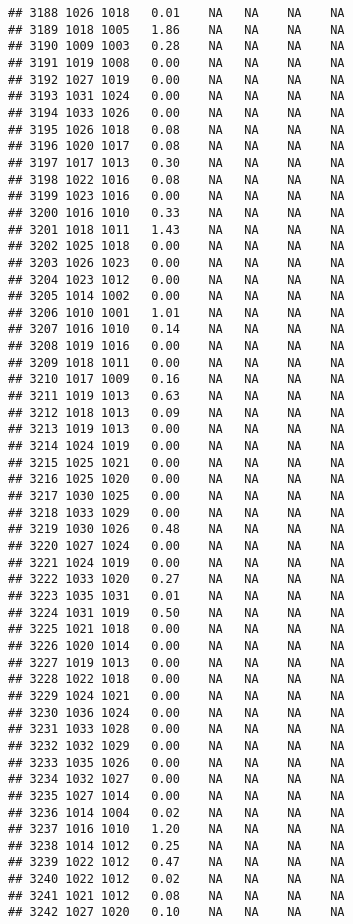 \documentclass{article}\usepackage{graphicx, color}
\makeatletter
\newenvironment{kframe}{%
 \def\at@end@of@kframe{}%
 \ifinner\ifhmode%
  \def\at@end@of@kframe{\end{minipage}}%
  \begin{minipage}{\columnwidth}%
 \fi\fi%
 \def\FrameCommand##1{\hskip\@totalleftmargin \hskip-\fboxsep
 \colorbox{shadecolor}{##1}\hskip-\fboxsep
     \hskip-\linewidth \hskip-\@totalleftmargin \hskip\columnwidth}%
 \MakeFramed {\advance\hsize-\width
   \@totalleftmargin\z@ \linewidth\hsize
   \@setminipage}}%
 {\par\unskip\endMakeFramed%
 \at@end@of@kframe}
\newenvironment{knitrout}{}{} %
\makeatother
\begin{document}
\begin{knitrout}
\begin{kframe}
\begin{verbatim}
## 3188 1026 1018   0.01    NA   NA    NA    NA
## 3189 1018 1005   1.86    NA   NA    NA    NA
## 3190 1009 1003   0.28    NA   NA    NA    NA
## 3191 1019 1008   0.00    NA   NA    NA    NA
## 3192 1027 1019   0.00    NA   NA    NA    NA
## 3193 1031 1024   0.00    NA   NA    NA    NA
## 3194 1033 1026   0.00    NA   NA    NA    NA
## 3195 1026 1018   0.08    NA   NA    NA    NA
## 3196 1020 1017   0.08    NA   NA    NA    NA
## 3197 1017 1013   0.30    NA   NA    NA    NA
## 3198 1022 1016   0.08    NA   NA    NA    NA
## 3199 1023 1016   0.00    NA   NA    NA    NA
## 3200 1016 1010   0.33    NA   NA    NA    NA
## 3201 1018 1011   1.43    NA   NA    NA    NA
## 3202 1025 1018   0.00    NA   NA    NA    NA
## 3203 1026 1023   0.00    NA   NA    NA    NA
## 3204 1023 1012   0.00    NA   NA    NA    NA
## 3205 1014 1002   0.00    NA   NA    NA    NA
## 3206 1010 1001   1.01    NA   NA    NA    NA
## 3207 1016 1010   0.14    NA   NA    NA    NA
## 3208 1019 1016   0.00    NA   NA    NA    NA
## 3209 1018 1011   0.00    NA   NA    NA    NA
## 3210 1017 1009   0.16    NA   NA    NA    NA
## 3211 1019 1013   0.63    NA   NA    NA    NA
## 3212 1018 1013   0.09    NA   NA    NA    NA
## 3213 1019 1013   0.00    NA   NA    NA    NA
## 3214 1024 1019   0.00    NA   NA    NA    NA
## 3215 1025 1021   0.00    NA   NA    NA    NA
## 3216 1025 1020   0.00    NA   NA    NA    NA
## 3217 1030 1025   0.00    NA   NA    NA    NA
## 3218 1033 1029   0.00    NA   NA    NA    NA
## 3219 1030 1026   0.48    NA   NA    NA    NA
## 3220 1027 1024   0.00    NA   NA    NA    NA
## 3221 1024 1019   0.00    NA   NA    NA    NA
## 3222 1033 1020   0.27    NA   NA    NA    NA
## 3223 1035 1031   0.01    NA   NA    NA    NA
## 3224 1031 1019   0.50    NA   NA    NA    NA
## 3225 1021 1018   0.00    NA   NA    NA    NA
## 3226 1020 1014   0.00    NA   NA    NA    NA
## 3227 1019 1013   0.00    NA   NA    NA    NA
## 3228 1022 1018   0.00    NA   NA    NA    NA
## 3229 1024 1021   0.00    NA   NA    NA    NA
## 3230 1036 1024   0.00    NA   NA    NA    NA
## 3231 1033 1028   0.00    NA   NA    NA    NA
## 3232 1032 1029   0.00    NA   NA    NA    NA
## 3233 1035 1026   0.00    NA   NA    NA    NA
## 3234 1032 1027   0.00    NA   NA    NA    NA
## 3235 1027 1014   0.00    NA   NA    NA    NA
## 3236 1014 1004   0.02    NA   NA    NA    NA
## 3237 1016 1010   1.20    NA   NA    NA    NA
## 3238 1014 1012   0.25    NA   NA    NA    NA
## 3239 1022 1012   0.47    NA   NA    NA    NA
## 3240 1022 1012   0.02    NA   NA    NA    NA
## 3241 1021 1012   0.08    NA   NA    NA    NA
## 3242 1027 1020   0.10    NA   NA    NA    NA

\end{verbatim}
\end{kframe}
\end{knitrout}
\end{document}
